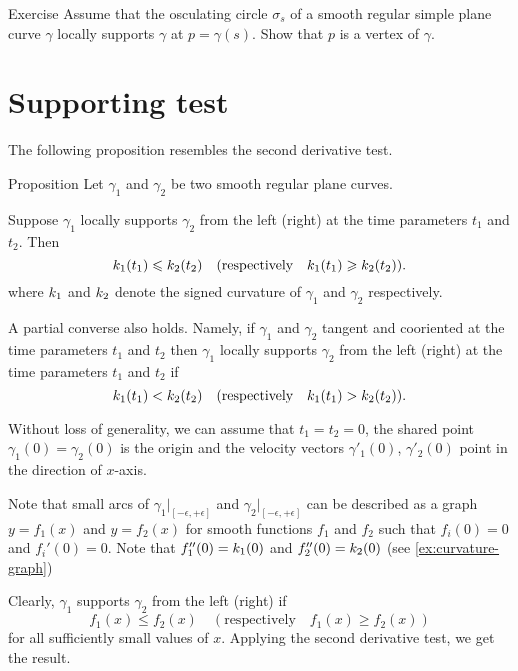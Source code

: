 \begin{thm}{Exercise}\label{ex:vertex-support}
Assume that the osculating circle $\sigma_s$ of a smooth regular simple plane curve $\gamma$ locally supports $\gamma$ at $p=\gamma(s)$.
Show that $p$ is a vertex of $\gamma$.
\end{thm}

\section{Supporting test}

The following proposition resembles the second derivative test. 

\begin{thm}{Proposition}\label{prop:supporting-circline}
Let $\gamma_1$ and $\gamma_2$ be two smooth regular plane curves.

Suppose $\gamma_1$ locally supports $\gamma_2$ from the left (right) at the time parameters $t_1$ and $t_2$.
Then 
\[k_1(t_1)\leqslant k_2(t_2)\quad(\text{respectively}\quad k_1(t_1)\geqslant k_2(t_2)).\]
where $k_1$ and $k_2$ denote the signed curvature of $\gamma_1$ and $\gamma_2$ respectively.

A partial converse also holds.
Namely, if $\gamma_1$ and $\gamma_2$ tangent and cooriented at the time parameters $t_1$ and $t_2$
then $\gamma_1$ locally supports $\gamma_2$ from the left (right) at the time parameters $t_1$ and $t_2$
if 
\[k_1(t_1)< k_2(t_2)\quad(\text{respectively}\quad k_1(t_1)> k_2(t_2)).\]

\end{thm}

 Without loss of generality, we can assume that $t_1=t_2=0$, the shared point $\gamma_1(0)=\gamma_2(0)$ is the origin and the velocity vectors $\gamma'_1(0)$, $\gamma'_2(0)$ point in the direction of $x$-axis.

Note that small arcs of $\gamma_1|_{[-\epsilon,+\epsilon]}$ and  $\gamma_2|_{[-\epsilon,+\epsilon]}$ can be described as a graph 
$y=f_1(x)$ and $y=f_2(x)$ for smooth functions $f_1$ and $f_2$ such that $f_i(0)=0$ and $f_i'(0)=0$.
Note that $f_1''(0)=k_1(0)$ and $f_2''(0)=k_2(0)$ (see \ref{ex:curvature-graph})

Clearly, $\gamma_1$ supports $\gamma_2$ from the left (right) if 
\[f_1(x)\le f_2(x)\quad(\text{respectively}\quad f_1(x)\ge f_2(x))\]
for all sufficiently small values of $x$.
Applying the second derivative test, we get the result.
\qeds



